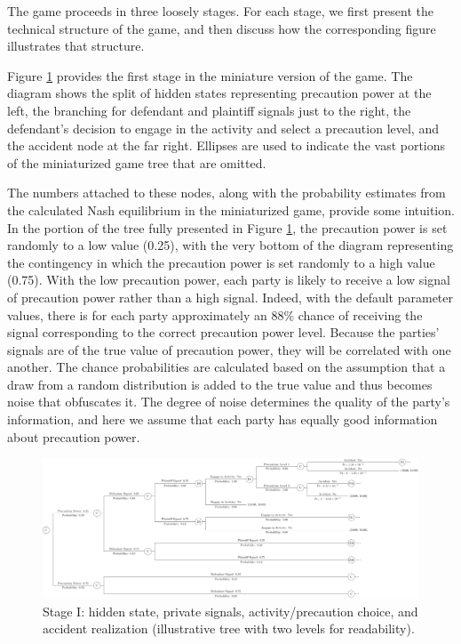 \documentclass{article}
\begin{document}
The game proceeds in three loosely stages. For each stage, we first present the technical structure of the game, and then discuss how the corresponding figure illustrates that structure. 

Figure \ref{fig:smalltree_beginning.pdf} provides the first stage in the miniature version of the game. The diagram shows the split of hidden states representing precaution power at the left, the branching for defendant and plaintiff signals just to the right, the defendant’s decision to engage in the activity and select a precaution level, and the accident node at the far right. Ellipses are used to indicate the vast portions of the miniaturized game tree that are omitted. 

The numbers attached to these nodes, along with the probability estimates from the calculated Nash equilibrium in the miniaturized game, provide some intuition. In the portion of the tree fully presented in Figure \ref{fig:smalltree_beginning.pdf}, the precaution power is set randomly to a low value (0.25), with the very bottom of the diagram representing the contingency in which the precaution power is set randomly to a high value (0.75). With the low precaution power, each party is likely to receive a low signal of precaution power rather than a high signal. Indeed, with the default parameter values, there is for each party approximately an 88\% chance of receiving the signal corresponding to the correct precaution power level. Because the parties' signals are of the true value of precaution power, they will be correlated with one another. The chance probabilities are calculated based on the assumption that a draw from a random distribution is added to the true value and thus becomes noise that obfuscates it. The degree of noise determines the quality of the party's information, and here we assume that each party has equally good information about precaution power.

  \begin{figure}[t]
    \centering
    \includegraphics[width=\textwidth]{../Figures/smalltree_beginning.pdf}
    \caption{Stage I: hidden state, private signals, activity/precaution choice, and accident realization (illustrative tree with two levels for readability).}
    \label{fig:smalltree_beginning.pdf}
  \end{figure}
\end{document}
